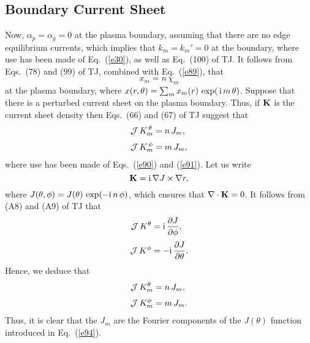 \documentclass[12pt,prb,aps,notitlepage]{revtex4-1}
\begin{document}
\subsection{Boundary Current Sheet}
Now, $\alpha_p=\alpha_g=0$ at the plasma boundary, assuming that there are no edge equilibrium currents,
which implies that $k_m=k_m'=0$ at the boundary, where use has been made of Eq.~(\ref{e30}),
as well as Eq.~(100) of TJ.  It follows from Eqs.~(78) and (99) of TJ, combined with Eq.~(\ref{e89}),  that 
\begin{equation}\label{e91}
x_m= n\,\chi_m
\end{equation}
at the plasma boundary, where $x(r,\theta)=\sum_m x_m(r)\,\exp(\,{\rm i}\,m\,\theta)$. 
Suppose that there is a perturbed current sheet on the plasma boundary. 
Thus, if ${\bf K}$ is the current sheet density then Eqs.~(66) and (67) of TJ suggest that
\begin{align}
{\cal J}\,K_m^{\,\theta} &=  n\,J_m,\\[0.5ex]
{\cal J}\,K_m^{\,\phi} &=m\,J_m,
\end{align}
where use has been made of Eqs.~(\ref{e90}) and (\ref{e91}). 
Let us write
\begin{equation}\label{e94}
{\bf K} = {\rm i}\,\nabla J\times \nabla r,
\end{equation}
where $J(\theta,\phi)=J(\theta)\,\exp(-{\rm i}\,n\,\phi)$, which ensures that $\nabla\cdot{\bf K}=0$. It follows from (A8) and (A9) of TJ that
\begin{align}
{\cal J}\,K^\theta&= {\rm i}\,\frac{\partial J}{\partial \phi},\\[0.5ex]
{\cal J}\,K^\phi &=-{\rm i}\,\frac{\partial J}{\partial\theta}.
\end{align}
Hence, we deduce that 
\begin{align}
{\cal J}\,K^\theta_m&= n\,J_m,\\[0.5ex]
{\cal J}\,K^\phi_m &=m\,J_m.
\end{align}
Thus, it is clear that the $J_m$ are the Fourier components of the $J(\theta)$ function introduced in Eq.~(\ref{e94}). 
\end{document}
